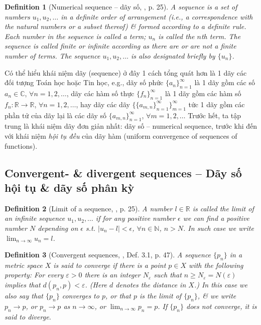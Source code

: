 \documentclass{article}
\newtheorem{definition}{Definition}
\begin{document}
\begin{definition}[Numerical sequence -- dãy số, \cite{Wrede_Spiegel2010}, p. 25]
	A {\rm sequence} is a set of numbers $u_1,u_2,\ldots$ in a definite order of arrangement (i.e., a {\rm correspondence} with the natural numbers or a subset thereof) \& formed according to a definite rule. Each number in the sequence is called a {\rm term}; $u_n$ is called the {\rm$n$th term}. The sequence is called {\rm finite} or {\rm infinite} according as there are or are not a finite number of terms. The sequence $u_1,u_2,\ldots$ is also designated briefly by $\{u_n\}$.
\end{definition}
Có thể hiểu khái niệm dãy (sequence) ở đây 1 cách tổng quát hơn là 1 dãy các đối tượng Toán học hoặc Tin học, e.g., dãy số phức $\{a_n\}_{n=1}^\infty$ là 1 dãy gồm các số $a_n\in\mathbb{C}$, $\forall n = 1,2,\ldots$, dãy các hàm số thực $\{f_n\}_{n=1}^\infty$ là 1 dãy gồm các hàm số $f_n:\mathbb{R}\to\mathbb{R}$, $\forall n = 1,2,\ldots$, hay dãy các dãy $\{\{a_{m,n}\}_{n=1}^\infty\}_{m=1}^\infty$ tức 1 dãy gồm các phần tử của dãy lại là các dãy số $\{a_{m,n}\}_{n=1}^\infty$, $\forall m = 1,2,\ldots$ Trước hết, ta tập trung là khái niệm dãy đơn giản nhất: dãy số -- numerical sequence, trước khi đến với khái niệm {\it hội tụ đều} của dãy hàm (uniform convergence of sequences of functions).


\subsection{Convergent- \& divergent sequences -- Dãy số hội tụ \& dãy số phân kỳ}

\begin{definition}[Limit of a sequence, \cite{Wrede_Spiegel2010}, p. 25]
	A number $l\in\mathbb{R}$ is called the {\rm limit} of an infinite sequence $u_1,u_2,\ldots$ if for any positive number $\epsilon$ we can find a positive number $N$ depending on $\epsilon$ s.t. $|u_n - l| < \epsilon$, $\forall n\in\mathbb{N}$, $n > N$. In such case we write $\lim_{n\to\infty} u_n = l$.
\end{definition}

\begin{definition}[Convergent sequences, \cite{Rudin1976}, Def. 3.1, p. 47]
	\label{def: convergent sequence in metric space}
	A sequence $\{p_n\}$ in a metric space $X$ is said to {\rm converge} if there is a point $p\in X$ with the following property: For every $\varepsilon > 0$ there is an integer $N_\varepsilon$ such that $n\ge N_\varepsilon = N(\varepsilon)$ implies that $d(p_n,p) < \varepsilon$. (Here $d$ denotes the {\rm distance} in $X$.) In this case we also say that $\{p_n\}$ converges to $p$, or that $p$ is the {\rm limit} of $\{p_n\}$, \& we write $p_n\to p$, or $p_n\to p$ as $n\to\infty$, or $\lim_{n\to\infty} p_n = p$. If $\{p_n\}$ does not converge, it is said to {\rm diverge}.
\end{definition}
\end{document}
